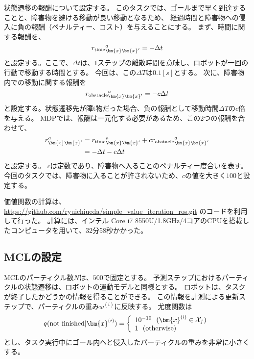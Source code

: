 状態遷移の報酬について設定する。
このタスクでは、ゴールまで早く到達することと、障害物を避ける移動が良い移動となるため、
経過時間と障害物への侵入に負の報酬（ペナルティー、コスト）を与えることにする。
まず、時間に関する報酬を、
\begin{equation}
\label{robot initial pose}
  {r_{\rm time}}^{a}_{\bm{x}\bm{x}^{\prime}} = -\Delta t
\end{equation}
と設定する。ここで、$\Delta t$は、$1$ステップの離散時間を意味し、ロボットが一回の行動で移動する時間とする。
今回は、この$\Delta T$は$0.1[s]$とする。
次に、障害物内での移動に関する報酬を
\begin{equation}
\label{robot initial pose}
  {r_{\rm obstacle}}^{a}_{\bm{x}\bm{x}^{\prime}} = -c\Delta t
\end{equation}
と設定する。状態遷移先が障t物だった場合、負の報酬として移動時間$\Delta T$の$c$倍を与える。
MDPでは、報酬は一元化する必要があるため、この2つの報酬を合わせて、
\begin{equation}
\label{robot initial pose}
\begin{split}
  r^{a}_{\bm{x}\bm{x}^{\prime}} &=
  {r_{\rm time}}^{a}_{\bm{x}\bm{x}^{\prime}} +
  c{r_{\rm obstacle}}^{a}_{\bm{x}\bm{x}^{\prime}} \\
  &= -\Delta t  -c\Delta t
\end{split}
\end{equation}
と設定する。
$c$は定数であり、障害物へ入ることのペナルティー度合いを表す。
今回のタスクでは、障害物に入ることが許されないため、$c$の値を大きく$100$と設定する。

価値関数の計算は、
\url{https://github.com/ryuichiueda/simple_value_iteration_ros.git}
のコードを利用して行った。
計算には、インテル Core i7 8550U/1.8GHz/4コアのCPUを搭載したコンピュータを用いて、32分58秒かかった。

\subsection{MCLの設定}
MCLのパーティクル数$N$は、$500$で固定とする。
予測ステップにおけるパーティクルの状態遷移は、ロボットの運動モデルと同様とする。
ロボットは、タスクが終了したかどうかの情報を得ることができる。
この情報を計測による更新ステップで、パーティクルの重み$w^{(i)}$に反映する。
尤度関数は
\begin{equation}
  q({\rm not \  finished} | \bm{x}^{(i)}) =
  \left\{
    \begin{array}{l}
      10^{-10} \ \ (\bm{x}^{(i)} \in \mathcal{X}_{f}) \\
      1 \ \ ({\rm otherwise})
    \end{array}
  \right.
\end{equation}
とし、タスク実行中にゴール内へと侵入したパーティクルの重みを非常に小さくする。

